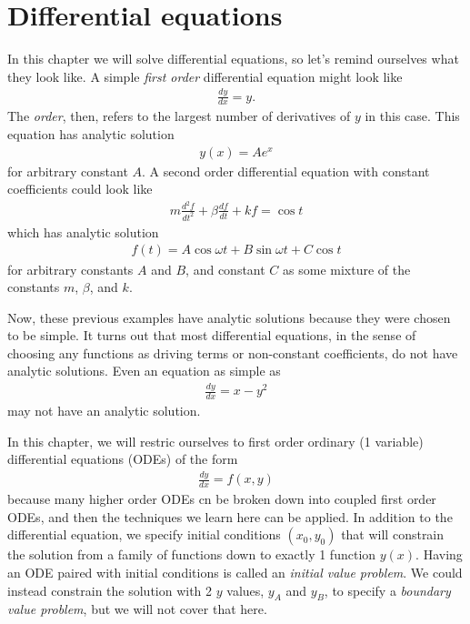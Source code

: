 \chapter{Differential equations} \label{ch:diffeqs}
In this chapter we will solve differential equations, so let's remind ourselves what they look like. A simple \textit{first order} differential equation might look like
\begin{align*}
\frac{dy}{dx} = y.
\end{align*}
The \textit{order}, then, refers to the largest number of derivatives of $y$ in this case. This equation has analytic solution
\begin{align*}
y(x) = A e^x
\end{align*}
for arbitrary constant $A$. A second order differential equation with constant coefficients could look like
\begin{align*}
m \frac{d^2f}{dt^2} + \beta \frac{df}{dt} + k f = \cos t
\end{align*}
which has analytic solution
\begin{align*}
f(t) = A \cos \omega t +  B \sin \omega t + C \cos t
\end{align*}
for arbitrary constants $A$ and $B$, and constant $C$ as some mixture of the constants $m$, $\beta$, and $k$.

Now, these previous examples have analytic solutions because they were chosen to be simple. It turns out that most differential equations, in the sense of choosing any functions as driving terms or non-constant coefficients, do not have analytic solutions. Even an equation as simple as
\begin{align*}
\frac{dy}{dx} = x - y^2
\end{align*}
may not have an analytic solution.

In this chapter, we will restric ourselves to first order ordinary (1 variable) differential equations (ODEs) of the form
\begin{align*}
\frac{dy}{dx} = f(x,y)
\end{align*}
because many higher order ODEs cn be broken down into coupled first order ODEs, and then the techniques we learn here can be applied. In addition to the differential equation, we specify initial conditions $(x_0,y_0)$ that will constrain the solution from a family of functions down to exactly 1 function $y(x)$. Having an ODE paired with initial conditions is called an \textit{initial value problem}. We could instead constrain the solution with 2 $y$ values, $y_A$ and $y_B$, to specify a \textit{boundary value problem}, but we will not cover that here.

